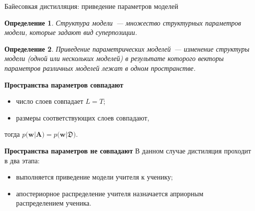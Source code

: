\documentclass[10pt,pdf,hyperref={unicode}]{beamer}
\newtheorem{rusdefinition}{Определение}
\begin{document}
\begin{frame}{Байесовкая дистилляция: приведение параметров моделей}
\begin{rusdefinition}
Структура модели~--- множество структурных параметров модели, которые задают вид суперпозиции.
\end{rusdefinition}

\begin{rusdefinition}
Приведение параметрических моделей~--- изменение структуры модели (одной или нескольких моделей) в результате которого векторы параметров различных моделей лежат в одном пространстве.
\end{rusdefinition}


\textbf{Пространства параметров совпадают}
\begin{itemize}
    \item число слоев совпадает $L=T$;
    \item размеры соответствующих слоев совпадают,
\end{itemize}
тогда $p\bigr(\mathbf{w}|\mathbf{A}\bigr) = p\bigr(\mathbf{w}|\mathfrak{D}\bigr)$.

\textbf{Пространства параметров не совпадают}
В данном случае дистиляция проходит в два этапа:
\begin{itemize}
    \item выполняется приведение модели учителя к ученику;
    \item апостериорное распределение учителя назначается априорным распределением ученика.
\end{itemize}

\end{frame}
\end{document}
